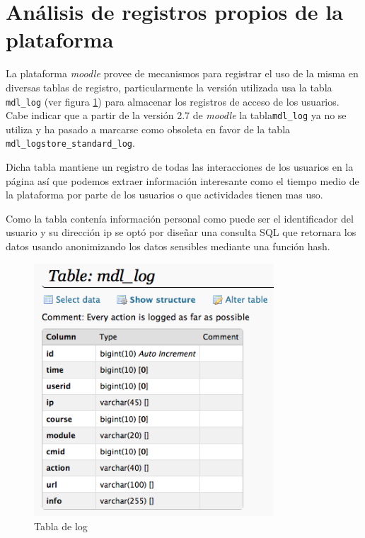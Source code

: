 \section{Análisis de registros propios de la plataforma}

La plataforma \textit{moodle} provee de mecanismos para registrar el uso de la misma en diversas tablas de registro, particularmente la versión utilizada usa la tabla \texttt{mdl\_log} (ver figura \ref{logtable}) para almacenar los registros de acceso de los usuarios. Cabe indicar que a partir de la versión 2.7 de \textit{moodle} la tabla\texttt{mdl\_log}  ya no se utiliza y ha pasado a marcarse como obsoleta\cite{art_09} en favor de la tabla \texttt{mdl\_logstore\_standard\_log}.

Dicha tabla mantiene un registro de todas las interacciones de los usuarios en la página así que podemos extraer información interesante como el tiempo medio de la plataforma por parte de los usuarios o que actividades tienen mas uso.

Como la tabla contenía información personal como puede ser el identificador del usuario y su dirección ip se optó por diseñar una consulta SQL que retornara los datos usando anonimizando los datos sensibles mediante una función hash.

\begin{figure}\centering\includegraphics[width=0.8\textwidth]{../images/logtable}\caption{Tabla de log}\label{logtable}\end{figure}

